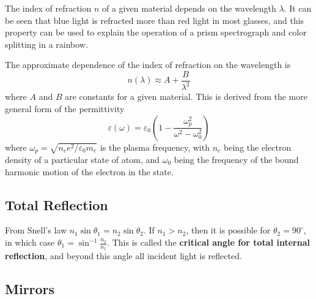 \documentclass[12pt, a4paper, oneside, openright, titlepage]{book}
\begin{document}
The index of refraction $n$ of a given material depends on the wavelength $\lambda$. It can be seen that blue light is refracted more than red light in most glasses, and this property can be used to explain the operation of a prism spectrograph and color splitting in a rainbow.


The approximate dependence of the index of refraction on the wavelength is
\begin{equation*}
    n(\lambda) \approx A+\frac{B}{\lambda^2}
\end{equation*}
where $A$ and $B$ are constants for a given material. This is derived from the more general form of the permittivity
\begin{equation*}
    \varepsilon(\omega) = \varepsilon_0\left(1-\frac{\omega_p^2}{\omega^2-\omega_0^2}\right)
\end{equation*}
where $\omega_p = \sqrt{n_ee^2/\varepsilon_0m_e}$ is the plasma frequency, with $n_e$ being the electron density of a particular state of atom, and $\omega_0$ being the frequency of the bound harmonic motion of the electron in the state.



\subsection{Total Reflection}

From Snell's law $n_1\sin\theta_1 = n_2\sin\theta_2$. If $n_1 > n_2$, then it is possible for $\theta_2 = 90^\circ$, in which case $\theta_1 = \sin^{-1}\frac{n_2}{n_1}$. This is called the \textbf{critical angle for total internal reflection}, and beyond this angle all incident light is reflected. 


\subsection{Mirrors}
\end{document}
